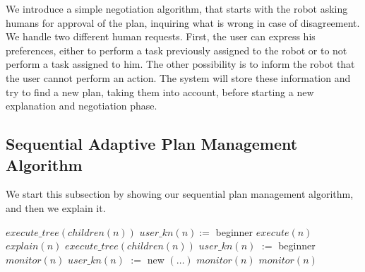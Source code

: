 We introduce a simple negotiation algorithm, that starts with the robot asking humans for approval of the plan, inquiring what is wrong in case of disagreement. We handle two different human requests. First, the user can express his preferences, either to perform a task previously assigned to the robot or to not perform a task assigned to him. The other possibility is to inform the robot that the user cannot perform an action. The system will store these information and try to find a new plan, taking them into account, before starting a new explanation and negotiation phase.


\subsection{Sequential Adaptive Plan Management Algorithm}
\label{subsec:plan_management-sequential_plan_management}
We start this subsection by showing our sequential plan management algorithm, and then we explain it.

\begin{algorithmic}[1]
	\label{alg:onlyRobotStart}
        	\State $execute\_tree(children(n))$
            \State $user\_kn(n) :=$ beginner
        \Else
         	\State $execute(n)$
        \EndIf\label{alg:onlyRobotEnd}
    \label{alg:newStart}
     	\State $explain(n)$
          	\State $execute\_tree(children(n))$
            \State $user\_kn(n)$ $:=$ beginner
        \Else
         	\State $monitor(n)$
        \EndIf\label{alg:newEnd}
    \label{alg:beginnerStart}
          	\State $user\_kn(n)$ $:=$ new
            \State $(\dots)$ 
        \Else
          	\State $monitor(n)$
        \EndIf\label{alg:beginnerEnd}
    \label{alg:interStart}
      	\State $monitor(n)$
    \EndIf\label{alg:interEnd}
\EndFor
\end{algorithmic}


